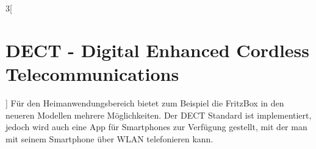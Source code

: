 \begin{multicols}{3}[\section{DECT - Digital Enhanced Cordless Telecommunications}]
Für den Heimanwendungsbereich bietet zum Beispiel die FritzBox in den neueren Modellen mehrere Möglichkeiten. Der DECT Standard ist implementiert, jedoch wird auch eine App für Smartphones zur Verfügung gestellt, mit der man mit seinem Smartphone über WLAN telefonieren kann. 
\cite{dect.6,dect.7,dect.8}
\printbibliography[segment=1,heading=subbibliography]
\end{multicols}

\newpage
